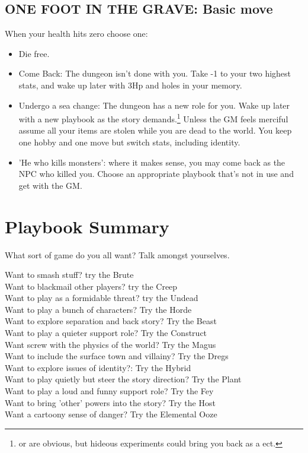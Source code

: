 \documentclass{tufte-book}
\begin{document}
\section{ONE FOOT IN THE GRAVE: Basic move}
When your health hits zero choose one:
\begin{itemize}
\item Die free.
\item Come Back: The dungeon isn't done with you. Take -1 to your two highest stats, and wake up later with 3Hp and holes in your memory.
\item Undergo a sea change: The dungeon has a new role for you. Wake up later with a new playbook as the story demands.\footnote{ or  are obvious, but hideous experiments could bring you back as a  ect.} Unless the GM feels merciful assume all your items are stolen while you are dead to the world. You keep one hobby and one move but switch stats, including identity. 
\item 'He who kills monsters': where it makes sense, you may come back as the NPC who killed you. Choose an appropriate playbook that's not in use and get with the GM.
\end{itemize}





\chapter{Playbook Summary}

What sort of game do you all want? Talk amongst yourselves.
\bigskip



Want to smash stuff? try the Brute\\
Want to blackmail other players? try the Creep\\
Want to play as a formidable threat? try the Undead\\
Want to play a bunch of characters? Try the Horde\\
Want to explore separation and back story? Try the Beast\\
Want to play a quieter support role? Try the Construct\\
Want screw with the physics of the world? Try the Magus\\
Want to include the surface town and villainy? Try the Dregs\\
Want to explore issues of identity?: Try the Hybrid\\
Want to play quietly but steer the story direction? Try the Plant\\
Want to play a loud and funny support role? Try the Fey\\
Want to bring 'other' powers into the story? Try the  Host\\ 
Want a cartoony sense of danger? Try the Elemental Ooze\\
\end{document}
